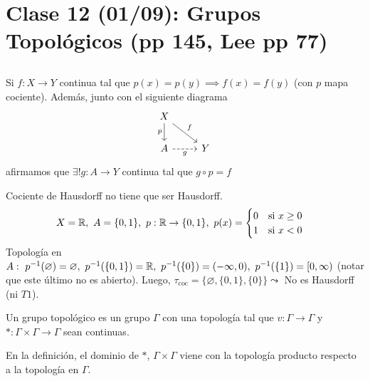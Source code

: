 \section{Clase 12 (01/09): Grupos Topológicos (pp 145, Lee pp 77)}

\subsection*{}

\begin{property}
	Si $f:X \to Y$ continua tal que $p(x) = p(y) \implies f(x) = f(y)$ (con $p$ mapa cociente). Además, junto con el siguiente diagrama
	\[
	\begin{tikzcd}
		{X} \arrow[d, "p"'] \arrow[rd, "f"] & \\
		A \arrow[r, dashrightarrow, "g"']                                                 & Y
	\end{tikzcd}
	\]
	afirmamos que $\exists ! g : A \to Y$ continua tal que $g \circ p = f$
\end{property}

\begin{eg}
	Cociente de Hausdorff no tiene que ser Hausdorff.
	\[
	X = \mathbb{R},\ A = \{0,1\},\ p : \mathbb{R} \to \{0,1\},\ p(x) = \begin{cases}
		0 \quad \text{si } x \geq 0 \\
		1 \quad \text{si } x < 0
	\end{cases}
	\]
	Topología en $A:\ p^{-1}(\varnothing) = \varnothing,\ p^{-1}(\{0,1\})=\R,\ p^{-1}(\{0\}) = (-\infty,0),\ p^{-1}(\{1\}) = [0,\infty)$ (notar que este último no es abierto). Luego, $\tau_{\text{coc}} = \{\varnothing, \{0,1\}, \{0\} \} \leadsto$ No es Hausdorff (ni $T1$).
\end{eg}

\begin{definition}
	Un grupo topológico es un grupo $\Gamma$ con una topología tal que $v: \Gamma \to \Gamma$ y $*:\Gamma \times \Gamma \to \Gamma$ sean continuas.
\end{definition}

\begin{observe}
	En la definición, el dominio de $*$, $\Gamma \times \Gamma$ viene con la topología producto respecto a la topología en $\Gamma$.
\end{observe}

